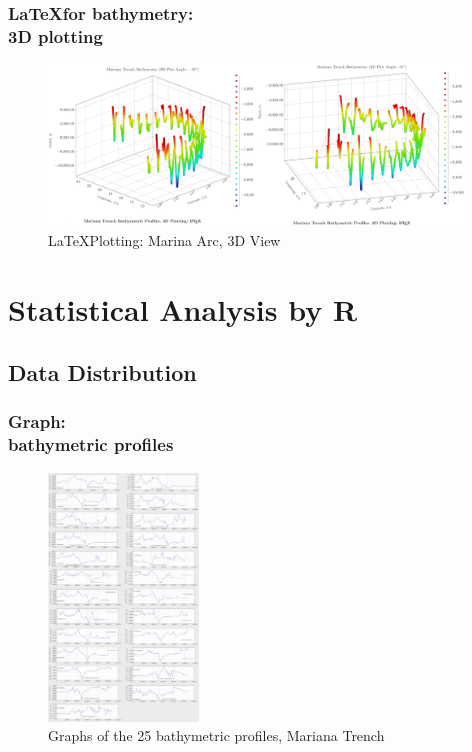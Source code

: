 \documentclass[pdflatex,compress,10pt,
	xcolor={dvipsnames,dvipsnames,svgnames,x11names,table},
	hyperref={colorlinks = true,breaklinks = true, urlcolor = NavyBlue, breaklinks = true}]{beamer}
\begin{document}
\begin{frame}\frametitle{\LaTeX \space for bathymetry:\\3D plotting}
\begin{figure}[H]
	\centering
		\includegraphics[width=11cm]{Fig-2-4.jpg}
	\caption{\LaTeX \space Plotting: Marina Arc, 3D View}\label{fig:2-4}
\end{figure}		
\end{frame}

\section{Statistical Analysis by R}
\subsection{Data Distribution}
\begin{frame}\frametitle{Graph:\\bathymetric profiles}
\begin{figure}[H]
	\centering
		\includegraphics[width=4cm]{Fig-2-5.jpg}
	\caption{Graphs of the 25 bathymetric profiles, Mariana Trench}\label{fig:2-5}
\end{figure}		
\end{frame}
\end{document}
